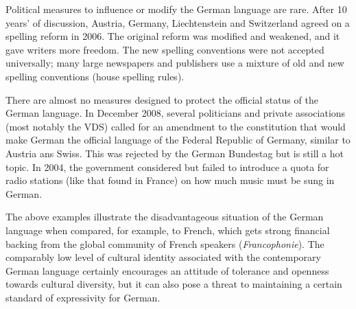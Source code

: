 \documentclass[]{../../metanetpaper}
\begin{document}
\begin{Parallel}[c]{79mm}{78mm}
{Political measures to influence or modify the German language are rare. After 10 years’ of discussion, Austria, Germany, Liechtenstein and Switzerland agreed on a spelling reform in 2006. The original reform was modified and weakened, and it gave writers more freedom. The new spelling conventions were not accepted universally; many large newspapers and publishers use a mixture of old and new spelling conventions (house spelling rules).

There are almost no measures designed to protect the official status of the German language. In December 2008, several politicians and private associations (most notably the VDS) called for an amendment to the constitution that would make German the official language of the Federal Republic of Germany, similar to Austria ans Swiss. This was rejected by the German Bundestag but is still a hot topic. In 2004, the government considered but failed to introduce a quota for radio stations (like that found in France) on how much music must be sung in German. 

The above examples illustrate the disadvantageous situation of the German language when compared, for example, to French, which gets strong financial backing from the global community of French speakers (\textit{Francophonie}). The comparably low level of cultural identity associated with the contemporary German language certainly encourages an attitude of tolerance and openness towards cultural diversity, but it can also pose a threat to maintaining a certain standard of expressivity for German.
  }

  \ParallelPar
  


\end{Parallel}
\end{document}
